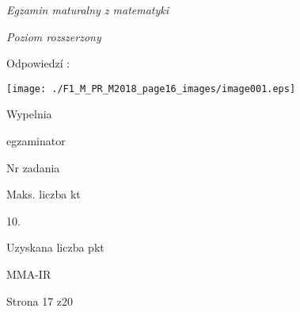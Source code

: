 \documentclass[a4paper,12pt]{article}
\begin{document}
{\it Egzamin maturalny z matematyki}

{\it Poziom rozszerzony}

Odpowiedzí :
\begin{center}
\texttt{[image: ./F1\_M\_PR\_M2018\_page16\_images/image001.eps]}
\end{center}
Wypelnia

egzaminator

Nr zadania

Maks. liczba kt

10.

Uzyskana liczba pkt

MMA-IR

Strona 17 z20
\end{document}

